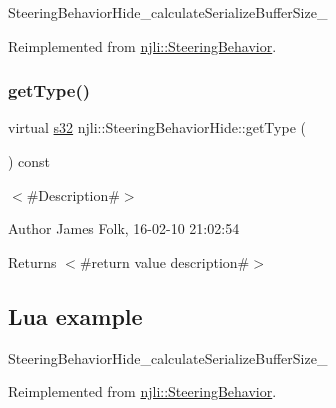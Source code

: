 \begin{DoxyCodeInclude}
\end{DoxyCodeInclude}
Steering\+Behavior\+Hide\+\_\+calculate\+Serialize\+Buffer\+Size\+\_\+ 

Reimplemented from \mbox{\hyperlink{classnjli_1_1_steering_behavior_abb58d6982dc295fc3e90f096f51b0ef8}{njli\+::\+Steering\+Behavior}}.

\mbox{\label{classnjli_1_1_steering_behavior_hide_a61d1b4266bbd4d83f306c66e2dbfdccc}} 
\subsubsection{\texorpdfstring{get\+Type()}{getType()}}
{\footnotesize\ttfamily virtual \mbox{\hyperlink{_util_8h_aa62c75d314a0d1f37f79c4b73b2292e2}{s32}} njli\+::\+Steering\+Behavior\+Hide\+::get\+Type (\begin{DoxyParamCaption}{ }\end{DoxyParamCaption}) const\hspace{0.3cm}{\ttfamily [virtual]}}



$<$\#\+Description\#$>$ 

\begin{DoxyAuthor}{Author}
James Folk, 16-\/02-\/10 21\+:02\+:54
\end{DoxyAuthor}
\begin{DoxyReturn}{Returns}
$<$\#return value description\#$>$
\end{DoxyReturn}
\hypertarget{classnjli_1_1_steering_behavior_wander_ex1}{}\subsection{Lua example}\label{classnjli_1_1_steering_behavior_wander_ex1}

\begin{DoxyCodeInclude}
\end{DoxyCodeInclude}
Steering\+Behavior\+Hide\+\_\+calculate\+Serialize\+Buffer\+Size\+\_\+ 

Reimplemented from \mbox{\hyperlink{classnjli_1_1_steering_behavior_ae82bca8468d41aff8c22b76fd359fe9b}{njli\+::\+Steering\+Behavior}}.

\mbox{\label{classnjli_1_1_steering_behavior_hide_accb443030b5c8985fa75d30d15d34355}} 
